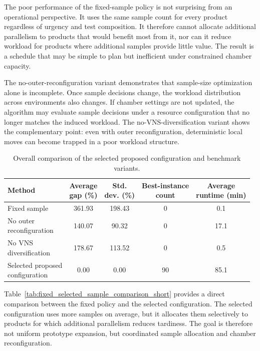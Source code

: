 \documentclass[11pt]{article}
\newcommand{\compacttable}{%
  \footnotesize
  \setlength{\tabcolsep}{2.8pt}%
  \renewcommand{\arraystretch}{0.86}%
}
\begin{document}
The poor performance of the fixed-sample policy is not surprising from an operational perspective. It uses the same sample count for every product regardless of urgency and test composition. It therefore cannot allocate additional parallelism to products that would benefit most from it, nor can it reduce workload for products where additional samples provide little value. The result is a schedule that may be simple to plan but inefficient under constrained chamber capacity.

The no-outer-reconfiguration variant demonstrates that sample-size optimization alone is incomplete. Once sample decisions change, the workload distribution across environments also changes. If chamber settings are not updated, the algorithm may evaluate sample decisions under a resource configuration that no longer matches the induced workload. The no-VNS-diversification variant shows the complementary point: even with outer reconfiguration, deterministic local moves can become trapped in a poor workload structure.

\begin{table}[H]
\centering
\caption{Overall comparison of the selected proposed configuration and benchmark variants.}
\label{tab:main_benchmark_comparison_short}
\compacttable
\begin{tabular}{lcccc}
\hline
\textbf{Method}
& \shortstack{\textbf{Average}\\\textbf{gap (\%)}}
& \shortstack{\textbf{Std.}\\\textbf{dev. (\%)}}
& \shortstack{\textbf{Best-instance}\\\textbf{count}}
& \shortstack{\textbf{Average}\\\textbf{runtime (min)}} \\
\hline
Fixed sample & 361.93 & 198.43 & 0 & 0.1 \\
\shortstack[l]{No outer\\reconfiguration} & 140.07 & 90.32 & 0 & 17.1 \\
\shortstack[l]{No VNS\\diversification} & 178.67 & 113.52 & 0 & 0.5 \\
\shortstack[l]{Selected proposed\\configuration} & 0.00 & 0.00 & 90 & 85.1 \\
\hline
\end{tabular}
\end{table}

Table~\ref{tab:fixed_selected_sample_comparison_short} provides a direct comparison between the fixed policy and the selected configuration. The selected configuration uses more samples on average, but it allocates them selectively to products for which additional parallelism reduces tardiness. The goal is therefore not uniform prototype expansion, but coordinated sample allocation and chamber reconfiguration.
\end{document}
